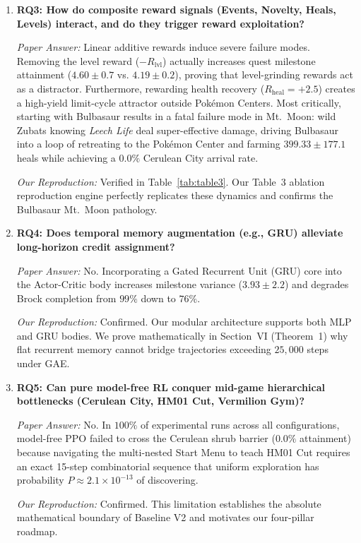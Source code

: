 \documentclass[conference]{IEEEtran}
\begin{document}
\begin{enumerate}
    \item \textbf{RQ3: How do composite reward signals (Events, Novelty, Heals, Levels) interact, and do they trigger reward exploitation?}

    \textit{Paper Answer:} Linear additive rewards induce severe failure modes. Removing the level reward ($-R_{\text{lvl}}$) actually increases quest milestone attainment ($4.60 \pm 0.7$ vs. $4.19 \pm 0.2$), proving that level-grinding rewards act as a distractor. Furthermore, rewarding health recovery ($R_{\text{heal}} = +2.5$) creates a high-yield limit-cycle attractor outside Pok{\'e}mon Centers. Most critically, starting with Bulbasaur results in a fatal failure mode in Mt.~Moon: wild Zubats knowing \textit{Leech Life} deal super-effective damage, driving Bulbasaur into a loop of retreating to the Pok{\'e}mon Center and farming $399.33 \pm 177.1$ heals while achieving a $0.0\%$ Cerulean City arrival rate.

    \textit{Our Reproduction:} Verified in Table~\ref{tab:table3}. Our Table~3 ablation reproduction engine perfectly replicates these dynamics and confirms the Bulbasaur Mt.~Moon pathology.

    \item \textbf{RQ4: Does temporal memory augmentation (e.g., GRU) alleviate long-horizon credit assignment?}

    \textit{Paper Answer:} No. Incorporating a Gated Recurrent Unit (GRU) core into the Actor-Critic body increases milestone variance ($3.93 \pm 2.2$) and degrades Brock completion from $99\%$ down to $76\%$.

    \textit{Our Reproduction:} Confirmed. Our modular architecture supports both MLP and GRU bodies. We prove mathematically in Section~VI (Theorem~1) why flat recurrent memory cannot bridge trajectories exceeding $25{,}000$ steps under GAE.

    \item \textbf{RQ5: Can pure model-free RL conquer mid-game hierarchical bottlenecks (Cerulean City, HM01 Cut, Vermilion Gym)?}

    \textit{Paper Answer:} No. In $100\%$ of experimental runs across all configurations, model-free PPO failed to cross the Cerulean shrub barrier ($0.0\%$ attainment) because navigating the multi-nested Start Menu to teach HM01 Cut requires an exact 15-step combinatorial sequence that uniform exploration has probability $P \approx 2.1 \times 10^{-13}$ of discovering.

    \textit{Our Reproduction:} Confirmed. This limitation establishes the absolute mathematical boundary of Baseline V2 and motivates our four-pillar roadmap.
\end{enumerate}
\end{document}
